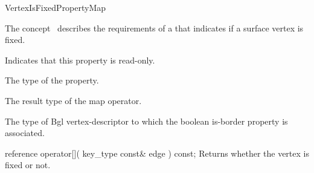 
\begin{ccRefConcept}{VertexIsFixedPropertyMap}


\ccDefinition

The concept \ccRefName\ describes the requirements of a  that indicates if a surface vertex is fixed.

\ccRefines
  
\ccTypes
    {Indicates that this property is read-only.}
  
    {The type of the property.}
    
    {The result type of the map operator.}

  {The type of {\sc Bgl vertex-descriptor} to which the boolean is-border property is associated.}

\ccCreation
{}  %

\ccOperations

\ccMethod
  {reference operator[]( key_type const& edge ) const;}
  {Returns whether the vertex is fixed or not.}  


\ccHasModels
{}\\
\\

\end{ccRefConcept}



